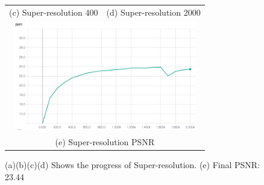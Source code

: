 \documentclass[A4]{article}
\begin{document}
\begin{figure}[H]
\begin{tabular}{cc}
(c) Super-resolution 400 & (d) Super-resolution 2000 \\[6pt]
\multicolumn{2}{c}{\includegraphics[width=80mm]{sr-psnr.png}}\\
\multicolumn{2}{c}{(e) Super-resolution PSNR }
\end{tabular}
\caption{(a)(b)(c)(d) Shows the progress of Super-resolution. (e) Final PSNR: 23.44}
\end{figure}
\end{document}
